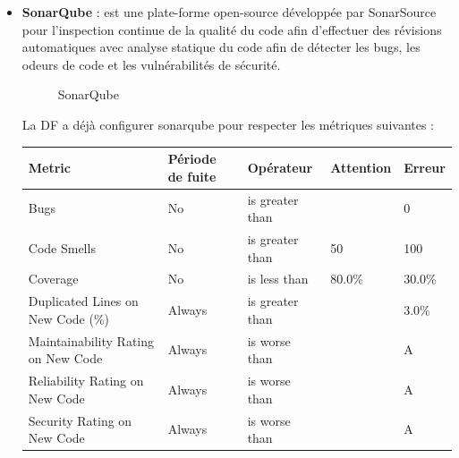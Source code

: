 \begin{itemize}
\item \textbf{SonarQube} : est une plate-forme open-source d\'evelopp\'ee par SonarSource pour l'inspection continue de la qualit\'e du code afin d'effectuer des r\'evisions automatiques avec analyse statique du code afin de d\'etecter les bugs, les odeurs de code et les vuln\'erabilit\'es de s\'ecurit\'e.

\begin{figure}[H]
	\caption{\label{fig:my-label} SonarQube}
\end{figure}

La \gls{DF} a d\'ej\`a configurer sonarqube pour respecter les m\'etriques suivantes :

\begin{table}[H]
\begin{center}
\begin{tabularx}{\textwidth}{ |p{5cm}|X|X|X|X| }
\hline Metric & P\'eriode de fuite & Op\'erateur & Attention & Erreur \\ \hline \hline

Bugs & No & is greater than	& & 0 \\\hline
Code Smells	& No & is greater than & 50 & 100 \\\hline
Coverage & No & is less than & 80.0\% & 30.0\% \\\hline
Duplicated Lines on New Code (\%) & Always & is greater than		& & 3.0\% \\\hline
Maintainability Rating on New Code & Always & is worse than & & A \\\hline
Reliability Rating on New Code & Always & is worse than & & A \\\hline
Security Rating on New Code & Always & is worse than & & A \\\hline


\end{tabularx}
\end{center}
\end{table}
\end{itemize}
